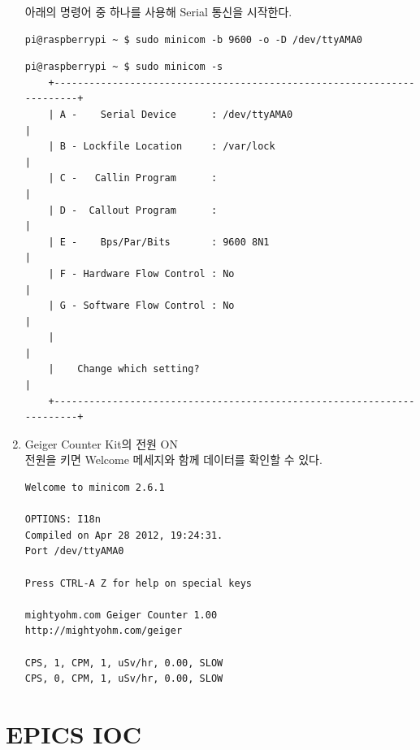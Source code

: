 \documentclass[11pt
  , a4paper
  , article
  , oneside
]{memoir}
\begin{document}
\begin{enumerate}
아래의 명령어 중 하나를 사용해 Serial 통신을 시작한다. 
\begin{lstlisting}[style=termstyle]
pi@raspberrypi ~ $ sudo minicom -b 9600 -o -D /dev/ttyAMA0
\end{lstlisting}


\begin{lstlisting}[style=termstyle]
pi@raspberrypi ~ $ sudo minicom -s
    +-----------------------------------------------------------------------+
    | A -    Serial Device      : /dev/ttyAMA0                              |
    | B - Lockfile Location     : /var/lock                                 |
    | C -   Callin Program      :                                           |
    | D -  Callout Program      :                                           |
    | E -    Bps/Par/Bits       : 9600 8N1                                  |
    | F - Hardware Flow Control : No                                        |
    | G - Software Flow Control : No                                        |
    |                                                                       |
    |    Change which setting?                                              |
    +-----------------------------------------------------------------------+
\end{lstlisting}

\item Geiger Counter Kit의 전원 ON\\
전원을 키면 Welcome 메세지와 함께 데이터를 확인할 수 있다\citep{datalogging}.
\begin{lstlisting}[style=termstyle]
Welcome to minicom 2.6.1

OPTIONS: I18n 
Compiled on Apr 28 2012, 19:24:31.
Port /dev/ttyAMA0

Press CTRL-A Z for help on special keys

mightyohm.com Geiger Counter 1.00
http://mightyohm.com/geiger

CPS, 1, CPM, 1, uSv/hr, 0.00, SLOW
CPS, 0, CPM, 1, uSv/hr, 0.00, SLOW

\end{lstlisting}
\end{enumerate}

\chapter{EPICS IOC}
\citep{gconpi}




\clearpage


\end{document}

